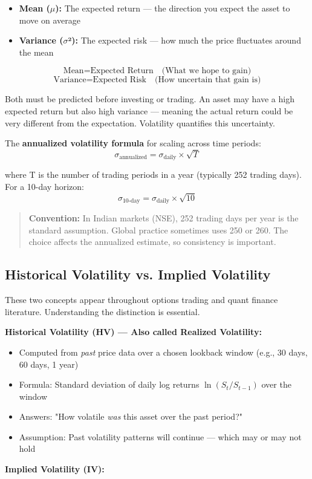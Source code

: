 \documentclass[12pt,openany]{book}
\theoremstyle{definition}
\theoremstyle{remark}
\begin{document}
\begin{itemize}
\item \textbf{Mean (\(\mu\)):} The expected return --- the direction you expect the asset to move on average


\item \textbf{Variance (\(\sigma\)²):} The expected risk --- how much the price fluctuates around the mean


\end{itemize}
\[
\text{Mean} = \text{Expected Return} \quad \text{(What we hope to gain)}
\]
\[
\text{Variance} = \text{Expected Risk} \quad \text{(How uncertain that gain is)}
\]

Both must be predicted before investing or trading. An asset may have a high expected return but also high variance --- meaning the actual return could be very different from the expectation. Volatility quantifies this uncertainty.

The \textbf{annualized volatility formula} for scaling across time periods: \[
\sigma_{\text{annualized}} = \sigma_{\text{daily}} \times \sqrt{T}
\]

where T is the number of trading periods in a year (typically 252 trading days). For a 10-day horizon: \[
\sigma_{10\text{-day}} = \sigma_{\text{daily}} \times \sqrt{10}
\]

\begin{quote}
\textbf{Convention:} In Indian markets (NSE), 252 trading days per year is the standard assumption. Global practice sometimes uses 250 or 260. The choice affects the annualized estimate, so consistency is important.

\end{quote}
\medskip
\subsection{Historical Volatility vs. Implied Volatility}
These two concepts appear throughout options trading and quant finance literature. Understanding the distinction is essential.

\textbf{Historical Volatility (HV) --- Also called Realized Volatility:}

\begin{itemize}
\item Computed from \emph{past} price data over a chosen lookback window (e.g., 30 days, 60 days, 1 year)


\item Formula: Standard deviation of daily log returns $\ln(S_t / S_{t-1})$ over the window


\item Answers: "How volatile \emph{was} this asset over the past period?"


\item Assumption: Past volatility patterns will continue --- which may or may not hold


\end{itemize}
\textbf{Implied Volatility (IV):}
\end{document}
